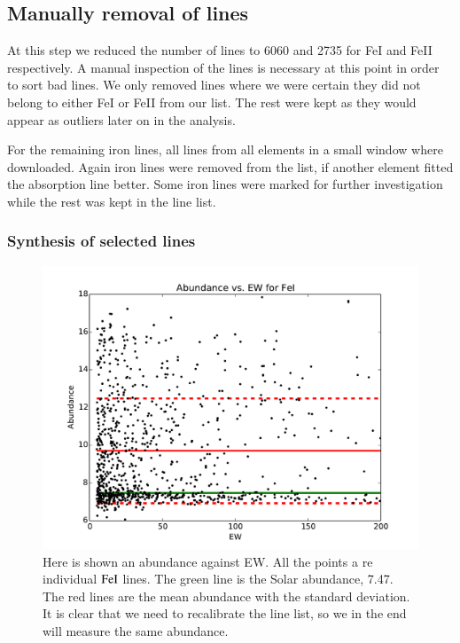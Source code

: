 \documentclass{aa}
\begin{document}
\subsection{Manually removal of lines}
\label{sub:manually_selection_of_lines}
At this step we reduced the number of lines to 6060 and 2735 for FeI and FeII
respectively. A manual inspection of the lines is necessary at this point in
order to sort bad lines.  We only removed lines where we were certain they did
not belong to either FeI or FeII from our list. The rest were kept as they
would appear as outliers later on in the analysis.

For the remaining iron lines, all lines from all elements in a small window
where downloaded. Again iron lines were removed from the list, if another
element fitted the absorption line better. Some iron lines were marked for
further investigation while the rest was kept in the line list.

\subsubsection{Synthesis of selected lines}
\label{sub:synthesis_of_selected_lines}








\begin{figure}[htb!]
    \centering
    \includegraphics[width=0.9\linewidth]{figures/Fe1.pdf}
    \caption{Here is shown an abundance against EW\@. All the points a re
        individual $\ce{FeI}$ lines. The green line is the Solar abundance,
7.47. The
        red lines are the mean abundance with the standard deviation. It is
        clear that we need to recalibrate the line list, so we in the end will
        measure the same abundance.}
\label{fig:Fe1}
\end{figure}
\end{document}
